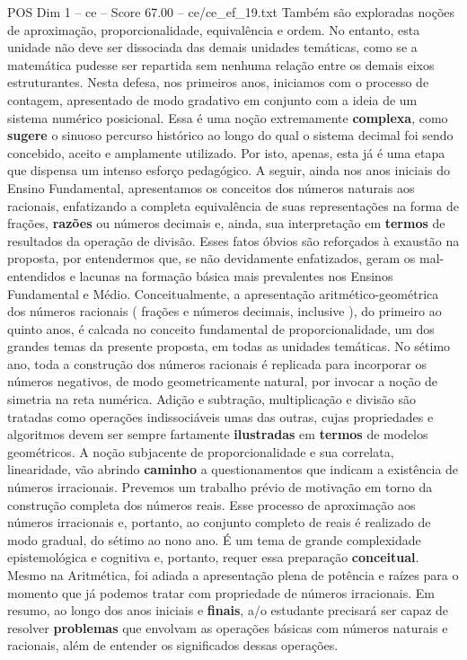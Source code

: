 \begin{textsample}{POS Dim 1 – ce – Score 67.00 – ce/ce\_ef\_19.txt}
Também são exploradas noções de aproximação, proporcionalidade, equivalência e ordem.
No entanto, esta unidade não deve ser dissociada das demais unidades temáticas, como se a matemática pudesse ser repartida sem nenhuma relação entre os demais eixos estruturantes.
Nesta defesa, nos primeiros anos, iniciamos com o processo de contagem, apresentado de modo gradativo em conjunto com a ideia de um sistema numérico posicional.
Essa é uma noção extremamente \textbf{complexa}, como \textbf{sugere} o sinuoso percurso histórico ao longo do qual o sistema decimal foi sendo concebido, aceito e amplamente utilizado.
Por isto, apenas, esta já é uma etapa que dispensa um intenso esforço pedagógico.
A seguir, ainda nos anos iniciais do Ensino Fundamental, apresentamos os conceitos dos números naturais aos racionais, enfatizando a completa equivalência de suas representações na forma de frações, \textbf{razões} ou números decimais e, ainda, sua interpretação em \textbf{termos} de resultados da operação de divisão.
Esses fatos óbvios são reforçados à exaustão na proposta, por entendermos que, se não devidamente enfatizados, geram os mal-entendidos e lacunas na formação básica mais prevalentes nos Ensinos Fundamental e Médio.
Conceitualmente, a apresentação aritmético-geométrica dos números racionais ( frações e números decimais, inclusive ), do primeiro ao quinto anos, é calcada no conceito fundamental de proporcionalidade, um dos grandes temas da presente proposta, em todas as unidades temáticas.
No sétimo ano, toda a construção dos números racionais é replicada para incorporar os números negativos, de modo geometricamente natural, por invocar a noção de simetria na reta numérica.
Adição e subtração, multiplicação e divisão são tratadas como operações indissociáveis umas das outras, cujas propriedades e algoritmos devem ser sempre fartamente \textbf{ilustradas} em \textbf{termos} de modelos geométricos.
A noção subjacente de proporcionalidade e sua correlata, linearidade, vão abrindo \textbf{caminho} a questionamentos que indicam a existência de números irracionais.
Prevemos um trabalho prévio de motivação em torno da construção completa dos números reais.
Esse processo de aproximação aos números irracionais e, portanto, ao conjunto completo de reais é realizado de modo gradual, do sétimo ao nono ano.
É um tema de grande complexidade epistemológica e cognitiva e, portanto, requer essa preparação \textbf{conceitual}.
Mesmo na Aritmética, foi adiada a apresentação plena de potência e raízes para o momento que já podemos tratar com propriedade de números irracionais.
Em resumo, ao longo dos anos iniciais e \textbf{finais}, a/o estudante precisará ser capaz de resolver \textbf{problemas} que envolvam as operações básicas com números naturais e racionais, além de entender os significados dessas operações.

\end{textsample}
